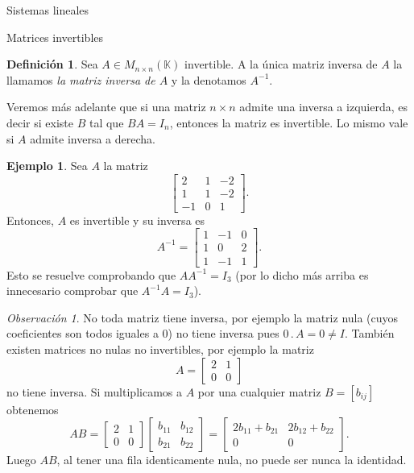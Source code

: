 \documentclass[a4paper,12pt,twoside,spanish]{amsbook}
\theoremstyle{definition}
\newtheorem{definicion}{Definici\'on}[section]
\newtheorem{ejemplo}{Ejemplo}[section]
\theoremstyle{remark}
\newtheorem{observacion}{Observaci\'on}[section]
\newcommand{\K}{\mathbb K}
\begin{document}
\begin{chapter}{Sistemas lineales}
\begin{section}{Matrices invertibles}
			
			
			\begin{definicion}
				Sea $A\in M_{n\times n}(\K)$ invertible. A la única matriz inversa de $A$ la llamamos \textit{la matriz inversa de $A$} y la denotamos $A^{-1}$.
			\end{definicion}
			
			Veremos más adelante que si una matriz $n \times n$ admite una inversa a izquierda,  es decir si existe $B$ tal que $BA=I_n$, entonces la matriz es invertible. Lo mismo vale si $A$  admite inversa a derecha.
			
			\begin{ejemplo}
				Sea $A$ la matriz 
				\begin{equation*}
				\begin{bmatrix} 2&1&-2\\ 1&1&-2\\ -1&0&1
				\end{bmatrix}.
				\end{equation*}
				Entonces,  $A$ es invertible y su inversa es
				\begin{equation*}
				A^{-1} = \begin{bmatrix} 1&-1&0\\ 1&0&2\\ 1&-1&1
				\end{bmatrix}.
				\end{equation*}
				Esto se resuelve comprobando que $AA^{-1}=I_3$ (por lo dicho más arriba es innecesario comprobar que $A^{-1}A=I_3$).
			\end{ejemplo} 
			
			\begin{observacion}
				No toda matriz tiene inversa, por ejemplo  la  matriz nula (cuyos coeficientes son todos iguales a $0$) no tiene inversa pues $0\,.\, A= 0 \not= I$.  También existen matrices no nulas no invertibles,  por ejemplo la matriz 
				\begin{equation*}
				A = \begin{bmatrix} 2&1\\ 0&0\end{bmatrix}
				\end{equation*}
				no tiene inversa.
				Si  multiplicamos a $A$ por una cualquier matriz  $B =[b_{ij}]$ obtenemos
				\begin{equation*}
				AB = \begin{bmatrix} 2&1\\ 0&0\end{bmatrix}
				\begin{bmatrix} b_{11}&b_{12}\\ b_{21}&b_{22}\end{bmatrix} =
				\begin{bmatrix} 2b_{11}+b_{21}&2b_{12}+b_{22}\\0 &0\end{bmatrix}.
				\end{equation*}
				Luego $AB$, al tener una fila identicamente nula, no puede ser nunca la identidad. 
			\end{observacion}
			

\end{section}
\end{chapter}
\end{document}
